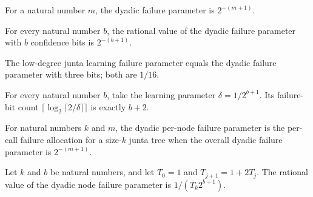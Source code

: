 \begin{definition}
\label{FABL.lowDegreeJuntaDyadicFailure}
\leanok
{}
For a natural number $m$, the dyadic failure parameter is $2^{-(m+1)}$.
\end{definition}

\begin{theorem}
\label{FABL.lowDegreeJuntaDyadicFailure_value}
\leanok
{}
For every natural number $b$, the rational value of the dyadic failure parameter with
$b$ confidence bits is $2^{-(b+1)}$.
\end{theorem}

\begin{theorem}
\label{FABL.lowDegreeJuntaLearningFailure_eq_dyadicFailure}
\leanok
{}
The low-degree junta learning failure parameter equals the dyadic failure parameter with
three bits; both are $1/16$.
\end{theorem}

\begin{theorem}
\label{FABL.fourierEstimatorFailureBits_lowDegreeJuntaDyadicFailure}
\leanok
{}
For every natural number $b$, take the learning parameter $\delta=1/2^{b+1}$. Its
failure-bit count $\lceil\log_2\lceil 2/\delta\rceil\rceil$ is exactly $b+2$.
\end{theorem}

\begin{definition}
\label{FABL.lowDegreeJuntaDyadicNodeFailure}
\leanok
{}
For natural numbers $k$ and $m$, the dyadic per-node failure parameter is the per-call
failure allocation for a size-$k$ junta tree when the overall dyadic failure parameter
is $2^{-(m+1)}$.
\end{definition}

\begin{theorem}
\label{FABL.lowDegreeJuntaDyadicNodeFailure_value}
\leanok
{}
Let $k$ and $b$ be natural numbers, and let $T_0=1$ and $T_{j+1}=1+2T_j$. The rational
value of the dyadic node failure parameter is $1/(T_k2^{b+1})$.
\end{theorem}


